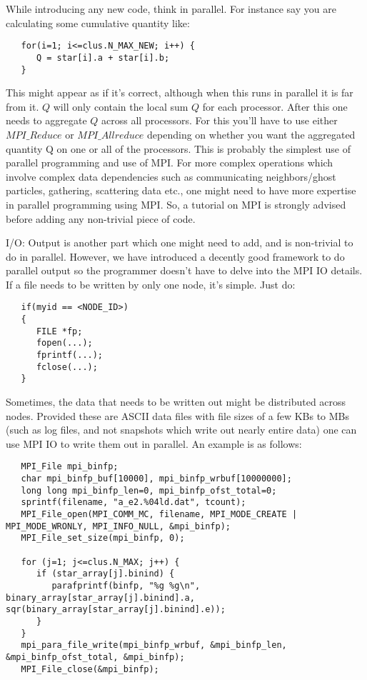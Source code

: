 \documentclass[11pt]{article}
\begin{document}
While introducing any new code, think in parallel. For instance say you are calculating some cumulative quantity like:

\begin{lstlisting}
   for(i=1; i<=clus.N_MAX_NEW; i++) {
      Q = star[i].a + star[i].b;
   }
\end{lstlisting}

This might appear as if it's correct, although when this runs in parallel it is far from it. $Q$ will only contain the local sum $Q$ for each processor. After this one needs to aggregate $Q$ across all processors. For this you'll have to use either $MPI\_Reduce$ or $MPI\_Allreduce$ depending on whether you want the aggregated quantity Q on one or all of the processors. This is probably the simplest use of parallel programming and use of MPI. For more complex operations which involve complex data dependencies such as communicating neighbors/ghost particles, gathering, scattering data etc., one might need to have more expertise in parallel programming using MPI. So, a tutorial on MPI is strongly advised before adding any non-trivial piece of code.

I/O:
Output is another part which one might need to add, and is non-trivial to do in parallel. However, we have introduced a decently good framework to do parallel output so the programmer doesn't have to delve into the MPI IO details. If a file needs to be written by only one node, it's simple. Just do:

\begin{lstlisting}
   if(myid == <NODE_ID>)
   {
      FILE *fp;
      fopen(...);
      fprintf(...);
      fclose(...);
   }
\end{lstlisting}

Sometimes, the data that needs to be written out might be distributed across nodes. Provided these are ASCII data files with file sizes of a few KBs to MBs (such as log files, and not snapshots which write out nearly entire data) one can use MPI IO to write them out in parallel. An example is as follows:

\begin{lstlisting}
   MPI_File mpi_binfp;
   char mpi_binfp_buf[10000], mpi_binfp_wrbuf[10000000];
   long long mpi_binfp_len=0, mpi_binfp_ofst_total=0;
   sprintf(filename, "a_e2.%04ld.dat", tcount);
   MPI_File_open(MPI_COMM_MC, filename, MPI_MODE_CREATE | MPI_MODE_WRONLY, MPI_INFO_NULL, &mpi_binfp);
   MPI_File_set_size(mpi_binfp, 0);

   for (j=1; j<=clus.N_MAX; j++) {
      if (star_array[j].binind) {
         parafprintf(binfp, "%g %g\n", binary_array[star_array[j].binind].a, sqr(binary_array[star_array[j].binind].e));
      }
   }
   mpi_para_file_write(mpi_binfp_wrbuf, &mpi_binfp_len, &mpi_binfp_ofst_total, &mpi_binfp);
   MPI_File_close(&mpi_binfp);
\end{lstlisting}
\end{document}
